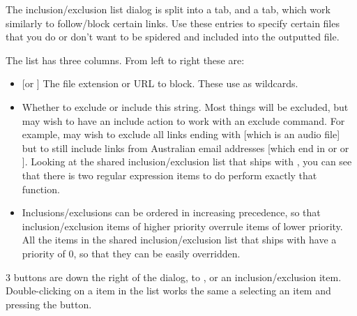 The inclusion/exclusion list dialog is split into a  tab, and a  tab, which work
similarly to follow/block certain links. Use these entries to specify certain 
files that you do or don't want to be spidered and included into the
outputted file.

The list has three columns. From left to right these are:

\begin{itemize}
  \item {} [or ] The file 
  extension or URL to block. These use
  \helpignore{\ref{sec:pd-exclusion-dialog-regular-expressions}}
  as wildcards.

  \item {} Whether to exclude or include this string. Most 
  things will be excluded, but may wish to have an include action to work with 
  an exclude command. For example, may wish to exclude all links ending with
   [which is an audio file] but to still include links from
  Australian email addresses [which end in  or  or
  ]. Looking at the shared inclusion/exclusion list that ships with 
  \brandingapplicationdesktopname, you can see that there is two regular expression 
  items to do perform exactly that function.

  \item {} Inclusions/exclusions can be ordered in increasing 
  precedence, so that inclusion/exclusion items of higher priority overrule items of 
  lower priority. All the items in the shared inclusion/exclusion list that ships 
  with \brandingapplicationdesktopname have a priority of 0, so that they can be easily 
  overridden.
\end{itemize}

3 buttons are down the right of the dialog, to ,
 or  an inclusion/exclusion item.
Double-clicking on a item in the list works the same a selecting an item and
pressing the  button.


